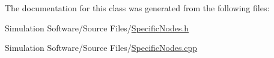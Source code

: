The documentation for this class was generated from the following files\+:\begin{DoxyCompactItemize}
\item 
Simulation Software/\+Source Files/\hyperlink{_specific_nodes_8h}{Specific\+Nodes.\+h}\item 
Simulation Software/\+Source Files/\hyperlink{_specific_nodes_8cpp}{Specific\+Nodes.\+cpp}\end{DoxyCompactItemize}
